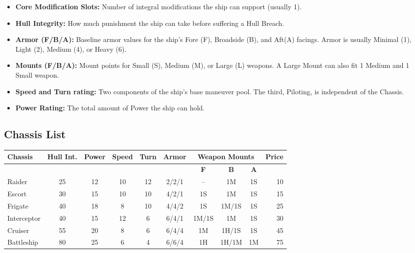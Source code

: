 \begin{itemize}
    \item \textbf{Core Modification Slots:} Number of integral modifications the ship can support (usually 1).
    \item \textbf{Hull Integrity:} How much punishment the ship can take before suffering a Hull Breach.
    \item \textbf{Armor (F/B/A):} Baseline armor values for the ship's Fore (F), Broadside (B), and Aft(A) facings. Armor is usually Minimal (1), Light (2), Medium (4), or Heavy (6).
    \item \textbf{Mounts (F/B/A):} Mount points for Small (S), Medium (M), or Large (L) weapons. A Large Mount can also fit 1 Medium and 1 Small weapon.
	\item \textbf{Speed and Turn rating:} Two components of the ship's base maneuver pool. The third, Piloting, is independent of the Chassis.
    \item \textbf{Power Rating:} The total amount of Power the ship can hold.
\end{itemize}

\subsection{Chassis List}

\begin{center}
\begin{tabular}{|l|c|c|c|c|c|*{3}{c|}r|}
\hline
\textbf{Chassis} & \textbf{Hull Int.} & \textbf{Power} & \textbf{Speed} & \textbf{Turn} & \textbf{Armor} 
& \multicolumn{3}{c|}{\textbf{Weapon Mounts}} & \textbf{Price} \\
\hline
\cline{7-9}
 & & & & & & \textbf{F} & \textbf{B} & \textbf{A} & \\
\hline
Raider 		& 25 	& 12 	& 10 	& 12 	& 2/2/1 & -- 	& 1M 	& 1S 	& 10 \\
Escort 		& 30 	& 15 	& 10 	& 10 	& 4/2/1 & 1S 	& 1M 	& 1S	& 15 \\
Frigate 	& 40 	& 18 	& 8 	& 10 	& 4/4/2 & 1S 	& 1M/1S	& 1S	& 25 \\
Interceptor & 40 	& 15 	& 12 	& 6 	& 6/4/1 & 1M/1S	& 1M 	& 1S	& 30 \\
Cruiser 	& 55 	& 20 	& 8 	& 6 	& 6/4/4 & 1M 	& 1H/1S	& 1S	& 45 \\
Battleship 	& 80 	& 25 	& 6 	& 4 	& 6/6/4 & 1H 	& 1H/1M	& 1M	& 75 \\
\hline
\end{tabular}
\end{center}


